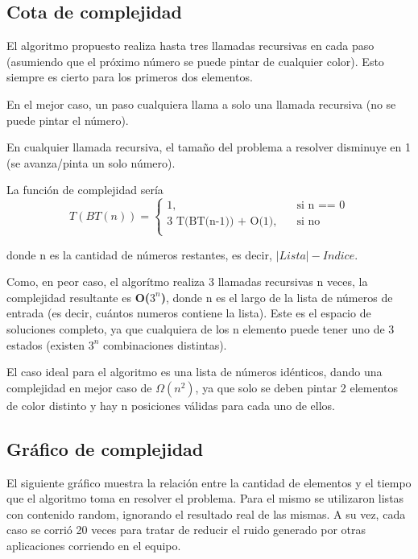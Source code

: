 	\subsection{Cota de complejidad}

	El algoritmo propuesto realiza hasta tres llamadas recursivas en cada paso (asumiendo que el próximo número se puede pintar de cualquier color). Esto siempre es cierto para los primeros dos elementos.

	En el mejor caso, un paso cualquiera llama a solo una llamada recursiva (no se puede pintar el número).

	En cualquier llamada recursiva, el tamaño del problema a resolver disminuye en 1 (se avanza/pinta un solo número).

	La función de complejidad sería
	\[
	T(BT(n)) =
		\begin{cases}
			\text{1,} &\quad\text{si n == 0}\\
			\text{3 T(BT(n-1)) + O(1),} &\quad\text{si no} \\
		\end{cases}
	\]

	donde n es la cantidad de números restantes, es decir, $|Lista| - Indice$.

	Como, en peor caso, el algorítmo realiza 3 llamadas recursivas n veces, la complejidad resultante es \textbf{O($3^n$)}, donde n es el largo de la lista de números de entrada (es decir, cuántos numeros contiene la lista). Este es el espacio de soluciones completo, ya que cualquiera de los n elemento puede tener uno de 3 estados (existen $3^n$ combinaciones distintas).

	El caso ideal para el algoritmo es una lista de números idénticos, dando una complejidad en mejor caso de $\Omega(n^2)$, ya que solo se deben pintar 2 elementos de color distinto y hay n posiciones válidas para cada uno de ellos.

	\pagebreak
	\subsection{Gráfico de complejidad}

	El siguiente gráfico muestra la relación entre la cantidad de elementos y el tiempo que el algoritmo toma en resolver el problema. Para el mismo se utilizaron listas con contenido random, ignorando el resultado real de las mismas. A su vez, cada caso se corrió 20 veces para tratar de reducir el ruido generado por otras aplicaciones corriendo en el equipo.

